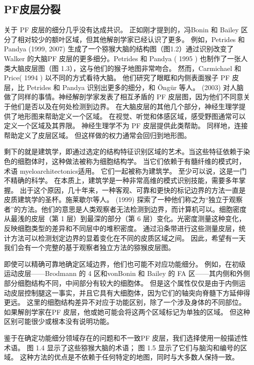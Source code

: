 \subsection{PF皮层分裂}
关于 PF 皮层的细分几乎没有达成共识。 正如刚才提到的，冯Bonin 和 Bailey 区分了相对较少的额叶区域，但其他解剖学家已经认识了更多。 例如，Petrides 和 Pandya (1999, 2007) 生成了一个猕猴大脑的结构图（图1.2）通过识别改变了 Walker 的大脑PF 皮层的更多细分。Petrides 和 Pandya ( 1995 ) 也制作了一张人类大脑皮层图（图 1.3），这与他们的猴子地图非常吻合。 然而，Carmichael 和 Price( 1994 ) 以不同的方式看待大脑。 他们研究了眼眶和内侧表面猴子 PF 皮层，比 Petrides 和 Pandya 识别出更多的细分，和 Öngür 等人。 (2003) 对人脑做了同样的事情。神经解剖学家发表了相互矛盾的 PF 皮层图，因为他们不同意关于他们是否以及在何处检测到边界。 在大脑皮层的其他几个部分，神经生理学提供了地形图来帮助定义一个区域。 在视觉、听觉和体感区域，感受野图通常可以定义一个区域及其界限。 神经生理学不为 PF 皮层提供此类帮助。 同样地，连接帮助定义了皮层区域。 但这样做的权力通常会回归到地形图。
\par
剩下的就是建筑学，即通过选定的结构特征识别区域的艺术。当这些特征依赖于染色的细胞体时，这种做法被称为细胞结构学。 当它们依赖于有髓纤维的模式时，术语 myeloarchitectonics适用。 它们一起被称为建筑学。 至少可以说，这是一门不精确的科学。 在本质上，建筑学是一种非常高维的模式识别技能，需要多年掌握。 出于这个原因，几十年来，一种客观、可靠和更快的标记边界的方法一直是皮质建筑学的圣杯。施莱歇尔等人。 (1999) 探索了一种他们称之为“独立于观察者”的方法。他们的意思是人类观察者无法检测到边界，而计算机可以。细胞密度从最浅的皮层（第 1 层）到最深的部分（第 6 层）变化。光密度测量这种变化，反映细胞类型的差异和不同层中的堆积密度。 通过沿条带进行这些测量皮层，统计方法可以检测划定边界的显着变化在不同的皮质区域之间。 因此，希望有一天我们会有一个完整的基于观察者独立方法的猕猴皮层图。
\par
即使可以精确可靠地确定区域边界，他们也可能不对应功能细分。 例如，在初级运动皮层——Brodmann 的 4 区和vonBonin 和 Bailey 的 FA 区——其内侧和外侧部分细胞结构不同，中间部分有较大的细胞体。 但是这个属性仅仅是由于内侧运动皮层控制腿这一事实，并且它具有大细胞体，因为它们的轴突向脊髓下方延伸得更远。 这里的细胞结构差异不对应于功能区别，除了一个涉及身体的不同部位。 如果解剖学家在PF 皮层，他或她可能会将这两个区域标记为单独的区域。 但这种区别可能很少或根本没有说明功能。
\par
鉴于在确定功能细分领域存在的问题和不一致PF 皮层，我们选择使用一般描述性术语。 图 1.4 显示了这些猕猴大脑的术语； 图 1.5 显示了它们与脑沟和编号的区域。 这种方法的优点是不依赖于任何特定的地图，同时与大多数人保持一致。
